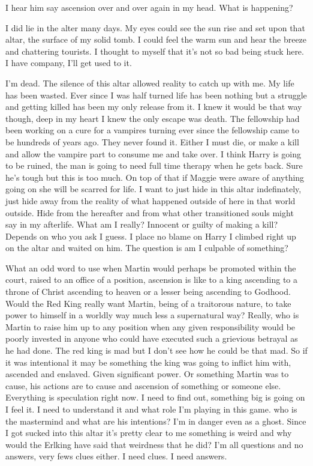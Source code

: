 I hear him say ascension over and over again in my head. What is happening? 

I did lie in the alter many days. My eyes could see the sun rise and set upon that altar, the surface of my solid tomb. I could feel the warm sun and hear the breeze and chattering tourists. I thought to myself that it's not so bad being stuck here. I have company, I'll get used to it.

I'm dead. The silence of this altar allowed reality to catch up with me. My life has been wasted. Ever since I was half turned life has been nothing but a struggle and getting killed has been my only release from it. I knew it would be that way though, deep in my heart I knew the only escape was death. The fellowship had been working on a cure for a vampires turning ever since the fellowship came to be hundreds of years ago. They never found it. Either I must die, or make a kill and allow the vampire part to consume me and take over. I think Harry is going to be ruined, the man is going to need full time therapy when he gets back. Sure he's tough but this is too much. On top of that if Maggie were aware of anything going on she will be scarred for life. I want to just hide in this altar indefinately, just hide away from the reality of what happened outside of here in that world outside. Hide from the hereafter and from what other transitioned souls might say in my afterlife. What am I really? Innocent or guilty of making a kill? Depends on who you ask I guess. I place no blame on Harry I climbed right up on the altar and waited on him. The question is am I culpable of something?

What an odd word to use when Martin would perhaps be promoted within the court, raised to an office of a position, ascension is like to a king ascending to a throne of Christ ascending to heaven or a lesser being ascending to Godhood. Would the Red King really want Martin, being of a traitorous nature, to take power to himself in a worldly way much less a supernatural way? Really, who is Martin to raise him up to any position when any given responsibility would be poorly invested in anyone who could have executed such a grievious betrayal as he had done. The red king is mad but I don't see how he could be that mad. So if it was intentional it may be something the king was going to inflict him with, ascended and enslaved. Given significant power. Or something Martin was to cause, his actions are to cause and ascension of something or someone else. Everything is speculation right now.
I need to find out, something big is going on I feel it. I need to understand it and what role I'm playing in this game. who is the mastermind and what are his intentions? I'm in danger even as a ghost. Since I got sucked into this altar it's pretty clear to me something is weird and why would the Erlking have said that weirdness that he did? I'm all questions and no answers, very fews clues either. I need clues. I need answers.

